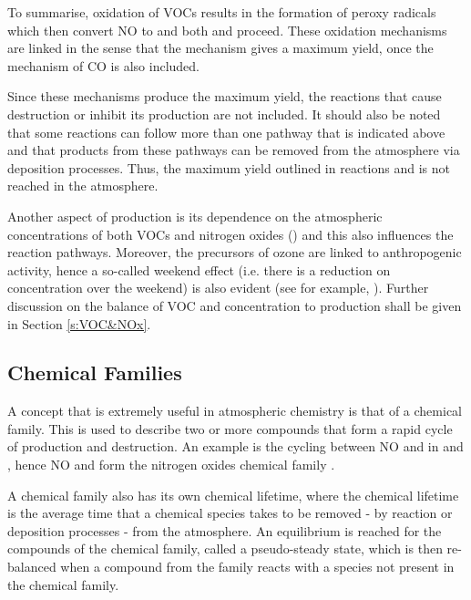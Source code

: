 To summarise, oxidation of VOCs results in the formation of peroxy radicals which then convert NO to  and both  and  proceed. 
These oxidation mechanisms are linked in the sense that the  mechanism gives a maximum  yield, once the mechanism of CO is also included. 

Since these mechanisms produce the maximum  yield, the reactions that cause  destruction or inhibit its production are not included. 
It should also be noted that some reactions can follow more than one pathway that is indicated above and that products from these pathways can be removed from the atmosphere via deposition processes. 
Thus, the maximum  yield outlined in reactions  and  is not reached in the atmosphere.

Another aspect of  production is its dependence on the atmospheric concentrations of both VOCs and nitrogen oxides () and this also influences the reaction pathways. 
Moreover, the precursors of ozone are linked to anthropogenic activity, hence a so-called weekend effect (i.e. there is a reduction on  concentration over the weekend) is also evident (see for example, \citep{Koo:2012}). 
Further discussion on the balance of VOC and  concentration to  production shall be given in Section \ref{s:VOC&NOx}.

\subsection{Chemical Families}

A concept that is extremely useful in atmospheric chemistry is that of a chemical family. 
This is used to describe two or more compounds that form a rapid cycle of production and destruction. 
An example is the cycling between NO and  in  and , hence NO and  form the nitrogen oxides chemical family .

A chemical family also has its own chemical lifetime, where the chemical lifetime is the average time that a chemical species takes to be removed - by reaction or deposition processes - from the atmosphere. 
An equilibrium is reached for the compounds of the chemical family, called a pseudo-steady state, which is then re-balanced when a compound from the family reacts with a species not present in the chemical family.

